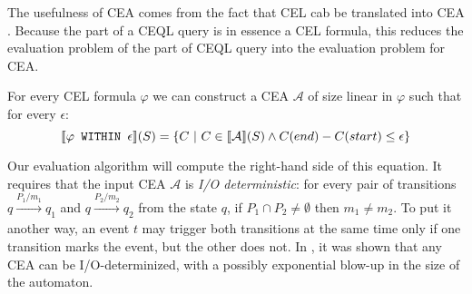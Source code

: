 The usefulness of CEA comes from the fact that CEL cab be translated into CEA \cite{formal-framework-cep,formal-framework-cer}. Because the  part of a CEQL query is in essence a CEL formula, this reduces the evaluation problem of the  part of CEQL query into the evaluation problem for CEA.

\begin{theorem}\label{theorem:cea}
  For every CEL formula $\varphi$ we can construct a CEA $\mathcal{A}$ of size linear in $\varphi$ such that for every $\epsilon$:
  \begin{equation*}
    \llbracket \varphi \texttt{ WITHIN } \epsilon \rrbracket(S) = \{ C \ | \ C \in \llbracket \mathcal{A} \rrbracket(S) \land C(end) - C(start) \le \epsilon \}
  \end{equation*}
\end{theorem}

Our evaluation algorithm will compute the right-hand side of this equation. It requires that the input CEA $\mathcal{A}$ is \emph{I/O deterministic}: for every pair of transitions $q \xrightarrow[]{P_{1}/m_{1}} q_{1}$ and $q \xrightarrow[]{P_{2}/m_{2}} q_{2}$ from the state $q$, if $P_{1} \cap P_{2} \ne \emptyset$ then $m_{1} \ne m_{2}$. To put it another way, an event $t$ may trigger both transitions at the same time only if one transition marks the event, but the other does not. In \cite{formal-framework-cep,formal-framework-cer}, it was shown that any CEA can be I/O-determinized, with a possibly exponential blow-up in the size of the automaton.

